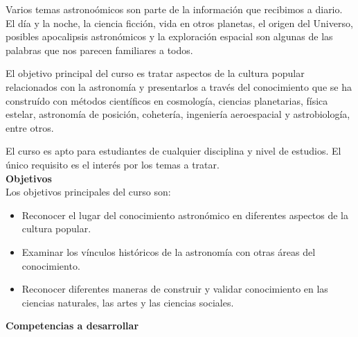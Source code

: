 \documentclass[letterpaper,10pt,onecolumn]{article}
\begin{document}

\noindent\normalsize 
Varios temas astrono\'omicos son parte de la
informaci\'on que recibimos a diario. El d\'ia y la noche, la
ciencia ficci\'on, vida en otros planetas, el origen del Universo,
posibles apocalipsis astron\'omicos y la exploraci\'on espacial son
algunas de las palabras que nos parecen familiares a todos.

\noindent\normalsize 
El objetivo principal del curso es tratar aspectos de la cultura
popular relacionados con la astronom\'ia y presentarlos a trav\'es del
conocimiento que se ha constru\'ido con m\'etodos cient\'ificos en
cosmolog\'ia, ciencias planetarias, f\'isica estelar, astronom\'ia de
posici\'on, coheter\'ia, ingenier\'ia aeroespacial y astrobiolog\'ia,
entre otros.

\noindent\normalsize 
El curso es apto para estudiantes de cualquier disciplina y nivel de
estudios. El \'unico requisito es el inter\'es por los temas a
tratar. \\[0.1cm]

\noindent\textbf{\large {} \quad Objetivos}\\[-0.2cm]


\noindent\normalsize Los objetivos principales del curso son:

\begin{itemize}
\item Reconocer el lugar del conocimiento astron\'omico en diferentes
  aspectos de la cultura popular. \\[-0.6cm] 

\item Examinar los v\'inculos hist\'oricos de la astronom\'ia con
  otras \'areas del conocimiento.  \\[-0.6cm] 

\item Reconocer diferentes maneras de construir y validar conocimiento
  en las ciencias naturales, las artes y las ciencias sociales. \\[-0.2cm]
\end{itemize}

\noindent\textbf{\large {} \quad Competencias a
  desarrollar}\\[-0.2cm] 
\end{document}
